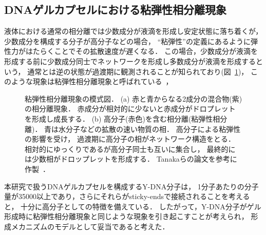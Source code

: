 \subsection{DNAゲルカプセルにおける粘弾性相分離現象}
液体における通常の相分離では少数成分が液滴を形成し安定状態に落ち着くが，
少数成分を構成する分子が高分子などの場合，
``粘弾性''の定義にあるように弾性力がはたらくことでその拡散速度が遅くなる．
この場合，少数成分が液滴を形成する前に少数成分同士でネットワークを形成し多数成分が液滴を形成するという，
通常とは逆の状態が過渡期に観測されることが知られており(図~\ref{fig:veps})，
このような現象は粘弾性相分離現象と呼ばれている~\cite{tanaka2009formation}，
\begin{figure}
    \centering
    
    \caption{
        粘弾性相分離現象の模式図．
        (a) 赤と青からなる2成分の混合物(紫)の相分離現象．
            赤成分が相対的に少ないと赤成分がドロプレットを形成し成長する．
        (b) 高分子(赤色)を含む相分離(粘弾性相分離)．
            青は水分子などの拡散の速い物質の相．
            高分子による粘弾性の影響を受け，
            過渡期に高分子の相がネットワーク構造をとる．
            相対的にゆっくりであるが高分子同士も互いに集合し，
            最終的には少数相がドロップレットを形成する．
        Tanakaらの論文を参考に作製~\cite{tanaka2009formation}．
    }
    \label{fig:veps}
\end{figure}

本研究で扱うDNAゲルカプセルを構成するY-DNA分子は，
1分子あたりの分子量が35000以上であり，さらにそれらがsticky-endsで接続されることを考えると，
十分に高分子としての特徴を備えている．
したがって，Y-DNA分子がゲル形成時に粘弾性相分離現象と同じような現象を引き起こすことが考えられ，
形成メカニズムのモデルとして妥当であると考えた．
